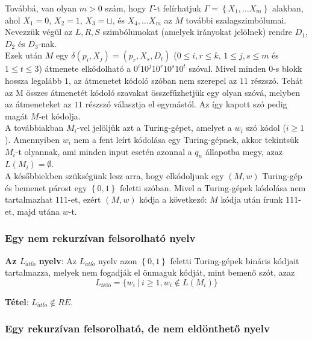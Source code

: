 \documentclass[tikz,12pt,margin=0px]{article}
\begin{document}
    \noindent Továbbá, van olyan $m > 0$ szám, hogy $\Gamma$-t felírhatjuk $\Gamma = \left\{X_{1}, \ldots X_{m}\right\}$ alakban, ahol $X_{1} = 0$, $X_{2} = 1$, $X_{3} = \sqcup$, és $X_{4}, \ldots X_{m}$ az $M$ további szalagszimbólumai. Nevezzük végül az $L, R, S$ szimbólumokat (amelyek irányokat jelölnek) rendre $D_{1}$, $D_{2}$ és $D_{3}$-nak.\\

    \noindent Ezek után $M$ egy $\delta(p_{i},X_{j}) = (p_{r}, X_{s}, D_{t})$ ($0 \leq i,r \leq k$, $1 \leq j,s \leq m$ és $1 \leq t \leq 3$)	átmenete elkódolható a $0^{i}10^{j}10^{r}10^{s}10^{t}$ szóval. Mivel minden $0$-s blokk hossza legalább $1$, az átmenetet kódoló szóban nem szerepel az $11$ részszó. Tehát az M összes átmenetét kódoló szavakat összefűzhetjük egy olyan szóvá, melyben az átmeneteket az $11$ részszó választja el egymástól. Az így kapott szó pedig magát $M$-et kódolja.\\
	
    \noindent A továbbiakban $M_{i}$-vel jelöljük azt a Turing-gépet, amelyet a $w_{i}$ szó kódol ($i \geq 1$). Amennyiben $w_{i}$ nem a fent leírt kódolása egy Turing-gépnek, akkor tekintsük $M_{i}$-t olyannak, ami minden input esetén azonnal a $q_{n}$ állapotba megy, azaz $L(M_{i}) = \emptyset$.\\
	
    \noindent A későbbiekben szükségünk lesz arra, hogy elkódoljunk egy $(M, w)$ Turing-gép és bemenet párost egy $\left\{0, 1\right\}$ feletti szóban. Mivel a Turing-gépek kódolása nem tartalmazhat $111$-et, ezért $(M, w)$ kódja a következő: $M$ kódja után írunk $111$-et, majd utána $w$-t.
	
	\subsubsection*{Egy nem rekurzívan felsorolható nyelv}
	
    \noindent \textbf{Az $L_{\acute{a}tl\acute{o}}$ nyelv}: Az $L_{\acute{a}tl\acute{o}}$ nyelv azon $\left\{0, 1\right\}$ feletti Turing-gépek bináris kódjait tartalmazza, melyek nem fogadják el önmaguk kódját, mint bemenő szót, azaz
    \[
        L_{\text{átló}} = \Big\{w_{i} \ \Big| \ i \geq 1, w_{i} \notin L(M_{i}) \Big\}
    \]
	
	\noindent \textbf{Tétel}: $L_{\acute{a}tl\acute{o}} \notin RE$.
	
	\subsubsection*{Egy rekurzívan felsorolható, de nem eldönthető nyelv}
	
\end{document}
